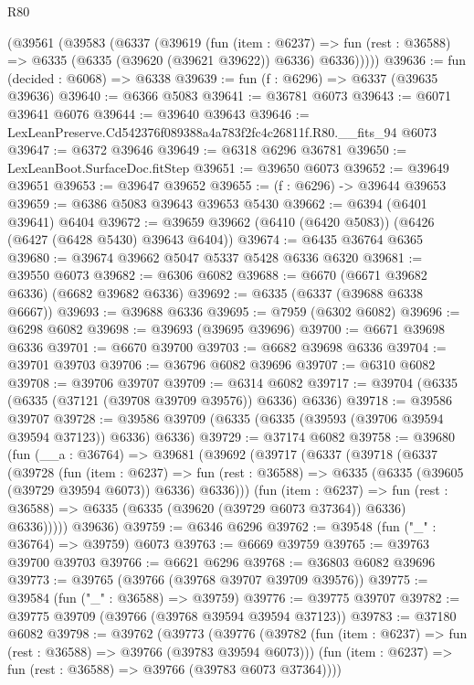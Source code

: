 \begin{lexlean}{R80}
\begin{coremodule}
    (@39561
      (@39583
        (@6337
          (@39619
            (fun (item : @6237) =>
            fun (rest : @36588) => @6335 (@6335 (@39620 (@39621 @39622)) @6336) @6336)))))
@39636 := fun (decided : @6068) => @6338
@39639 := fun (f : @6296) => @6337 (@39635 @39636)
@39640 := @6366 @5083
@39641 := @36781 @6073
@39643 := @6071 @39641 @6076
@39644 := @39640 @39643
@39646 := LexLeanPreserve.Cd542376f089388a4a783f2fc4c26811f.R80.__fits_94 @6073
@39647 := @6372 @39646
@39649 := @6318 @6296 @36781
@39650 := LexLeanBoot.SurfaceDoc.fitStep
@39651 := @39650 @6073
@39652 := @39649 @39651
@39653 := @39647 @39652
@39655 := (f : @6296) -> @39644 @39653
@39659 := @6386 @5083 @39643 @39653 @5430
@39662 := @6394 (@6401 @39641) @6404
@39672 := @39659 @39662 (@6410 (@6420 @5083)) (@6426 (@6427 (@6428 @5430) @39643 @6404))
@39674 := @6435 @36764 @6365
@39680 := @39674 @39662 @5047 @5337 @5428 @6336 @6320
@39681 := @39550 @6073
@39682 := @6306 @6082
@39688 := @6670 (@6671 @39682 @6336) (@6682 @39682 @6336)
@39692 := @6335 (@6337 (@39688 @6338 @6667))
@39693 := @39688 @6336
@39695 := @7959 (@6302 @6082)
@39696 := @6298 @6082
@39698 := @39693 (@39695 @39696)
@39700 := @6671 @39698 @6336
@39701 := @6670 @39700
@39703 := @6682 @39698 @6336
@39704 := @39701 @39703
@39706 := @36796 @6082 @39696
@39707 := @6310 @6082
@39708 := @39706 @39707
@39709 := @6314 @6082
@39717 := @39704 (@6335 (@6335 (@37121 (@39708 @39709 @39576)) @6336) @6336)
@39718 := @39586 @39707
@39728 := @39586 @39709 (@6335 (@6335 (@39593 (@39706 @39594 @39594 @37123)) @6336) @6336)
@39729 := @37174 @6082
@39758 := @39680
    (fun (__a : @36764) =>
    @39681
      (@39692
        (@39717
          (@6337
            (@39718
              (@6337
                (@39728
                  (fun (item : @6237) =>
                  fun (rest : @36588) => @6335 (@6335 (@39605 (@39729 @39594 @6073)) @6336) @6336)))
              (fun (item : @6237) =>
              fun (rest : @36588) => @6335 (@6335 (@39620 (@39729 @6073 @37364)) @6336) @6336)))))
      @39636)
@39759 := @6346 @6296
@39762 := @39548 (fun ("_" : @36764) => @39759) @6073
@39763 := @6669 @39759
@39765 := @39763 @39700 @39703
@39766 := @6621 @6296
@39768 := @36803 @6082 @39696
@39773 := @39765 (@39766 (@39768 @39707 @39709 @39576))
@39775 := @39584 (fun ("_" : @36588) => @39759)
@39776 := @39775 @39707
@39782 := @39775 @39709 (@39766 (@39768 @39594 @39594 @37123))
@39783 := @37180 @6082
@39798 := @39762
    (@39773
      (@39776
        (@39782 (fun (item : @6237) => fun (rest : @36588) => @39766 (@39783 @39594 @6073)))
        (fun (item : @6237) => fun (rest : @36588) => @39766 (@39783 @6073 @37364))))

\end{coremodule}
\end{lexlean}
